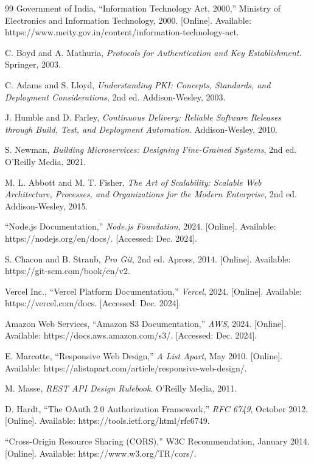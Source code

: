 \begin{thebibliography}{99}
Government of India, ``Information Technology Act, 2000,'' Ministry of Electronics and Information Technology, 2000. [Online]. Available: https://www.meity.gov.in/content/information-technology-act.

C. Boyd and A. Mathuria, \textit{Protocols for Authentication and Key Establishment}. Springer, 2003.

C. Adams and S. Lloyd, \textit{Understanding PKI: Concepts, Standards, and Deployment Considerations}, 2nd ed. Addison-Wesley, 2003.

J. Humble and D. Farley, \textit{Continuous Delivery: Reliable Software Releases through Build, Test, and Deployment Automation}. Addison-Wesley, 2010.

S. Newman, \textit{Building Microservices: Designing Fine-Grained Systems}, 2nd ed. O'Reilly Media, 2021.

M. L. Abbott and M. T. Fisher, \textit{The Art of Scalability: Scalable Web Architecture, Processes, and Organizations for the Modern Enterprise}, 2nd ed. Addison-Wesley, 2015.

``Node.js Documentation,'' \textit{Node.js Foundation}, 2024. [Online]. Available: https://nodejs.org/en/docs/. [Accessed: Dec. 2024].

S. Chacon and B. Straub, \textit{Pro Git}, 2nd ed. Apress, 2014. [Online]. Available: https://git-scm.com/book/en/v2.

Vercel Inc., ``Vercel Platform Documentation,'' \textit{Vercel}, 2024. [Online]. Available: https://vercel.com/docs. [Accessed: Dec. 2024].

Amazon Web Services, ``Amazon S3 Documentation,'' \textit{AWS}, 2024. [Online]. Available: https://docs.aws.amazon.com/s3/. [Accessed: Dec. 2024].

E. Marcotte, ``Responsive Web Design,'' \textit{A List Apart}, May 2010. [Online]. Available: https://alistapart.com/article/responsive-web-design/.

M. Masse, \textit{REST API Design Rulebook}. O'Reilly Media, 2011.

D. Hardt, ``The OAuth 2.0 Authorization Framework,'' \textit{RFC 6749}, October 2012. [Online]. Available: https://tools.ietf.org/html/rfc6749.

``Cross-Origin Resource Sharing (CORS),'' W3C Recommendation, January 2014. [Online]. Available: https://www.w3.org/TR/cors/.

\end{thebibliography}

\newpage
